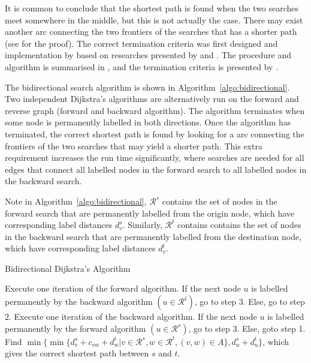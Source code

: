 It is common to conclude that the shortest path is found when the two searches meet somewhere in the middle,
but this is not actually the case.
There may exist another arc connecting the two frontiers of the searches that has a shorter path (see \citet{Klunder} for the proof).
The correct termination criteria was first designed and implementation by \citet{Pohl} based on researches presented by \citet{Dantzig, Nicholson} and \citet{Dreyfus}.
The procedure and algorithm is summarised in \citet{Klunder}, and the termination criteria is presented by \citet{Pohl}.

The bidirectional search algorithm is shown in Algorithm~\ref{algo:bidirectional}.
Two independent Dijkstra's algorithms are alternatively run on the forward and reverse graph (forward and backward algorithm).
The algorithm terminates when some node is permanently labelled in both directions.
Once the algorithm has terminated,
the correct shortest path is found by looking for a arc connecting the frontiers of the two searches that may yield a shorter path.
This extra requirement increases the run time significantly, 
where searches are needed for all edges that connect all labelled nodes in the forward search to all labelled nodes in the backward search.

Note in Algorithm~\ref{algo:bidirectional},
$\mathcal{R}^s$ contains the set of nodes in the forward search that are permanently labelled from the origin node,
which have corresponding label distances $d_v^s$.
Similarly, $\mathcal{R}^t$ contains contains the set of nodes in the backward search that are permanently labelled from the destination node,
which have corresponding label distances $d_v^t$.

\begin{algorithm}[H]
    \caption{Bidirectional Dijkstra's Algorithm}
    \label{algo:bidirectional}
    \begin{algorithmic}[1]
        \State Execute one iteration of the forward algorithm.
        If the next node $u$ is labelled permanently by the 
        backward algorithm $(u\in\mathcal{R}^t)$, go to step 3.
        Else, go to step 2.
        \State Execute one iteration of the backward algorithm.
        If the next node $u$ is labelled permanently by the
        forward algorithm $(u\in\mathcal{R}^s)$, go to step 3.
        Else, goto step 1.
        \State Find $\min\{\min\{d_v^s + c_{vw} + d_w^t | v \in \mathcal{R}^s, w \in \mathcal{R}^t, (v, w) \in A\}, d_u^s + d_u^t\}$, which gives the correct shortest path between $s$ and $t$.
    \EndProcedure
\end{algorithmic}
\end{algorithm}

